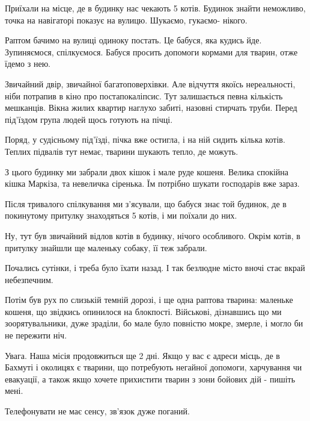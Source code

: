Приїхали на місце, де в будинку нас чекають 5 котів. Будинок знайти неможливо,
точка на навігаторі показує на вулицю. Шукаємо, гукаємо- нікого.

Раптом бачимо на вулиці одиноку постать. Це бабуся, яка кудись йде.
Зупиняємося, спілкуємося. Бабуся просить допомоги кормами для тварин, отже
їдемо з нею. 

Звичайний двір, звичайної багатоповерхівки. Але відчуття якоїсь нереальності,
ніби потрапив в кіно про постапокаліпсис. Тут залишається певна кількість
мешканців. Вікна жилих квартир наглухо забиті, назовні стирчать труби.  Перед
під'їздом група людей щось готують на пічці. 

Поряд, у судісньому під'їзді, пічка вже остигла, і на ній сидить кілька котів.
Теплих підвалів тут немає, тварини шукають тепло, де можуть.

З цього будинку ми забрали двох кішок і мале руде кошеня. Велика спокійна кішка
Маркіза, та невеличка сіренька. Їм потрібно шукати господарів вже зараз.

Після тривалого спілкування ми з'ясували, що бабуся знає той будинок, де в
покинутому притулку знаходяться 5 котів, і ми поїхали до них.

Ну, тут був звичайний відлов котів в будинку, нічого особливого. Окрім котів, в
притулку знайшли ще маленьку собаку, її теж забрали.

Почались сутінки, і треба було їхати назад. І так безлюдне місто вночі стає
вкрай небезпечним.

Потім був рух по слизькій темній дорозі, і ще одна раптова тварина: маленьке
кошеня, що звідкись опинилося на блокпості. Військові, дізнавшись що ми
зоорятувальники, дуже зраділи, бо мале було повністю мокре, змерле, і могло би
не пережити ніч.

Увага. Наша місія продовжиться ще 2 дні. Якщо у вас є адреси місць, де в
Бахмуті і околицях є тварини, що потребують негайної допомоги, харчування чи
евакуації, а також якщо хочете прихистити тварин з зони бойових дій - пишіть
мені. 

Телефонувати не має сенсу, зв'язок дуже поганий.
